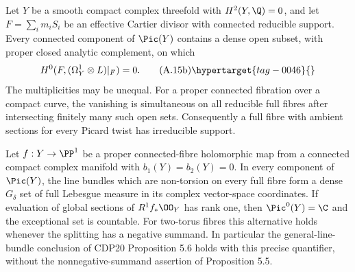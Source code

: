 \begin{proposition}\hypertarget{tag-01AP}{}\label{cdp:st:A.3.5}


Let $Y$ be a smooth compact complex threefold with $H^2(Y,\Q)=0$, and let $F=\sum_i m_iS_i$ be an effective Cartier divisor with connected reducible support. Every connected component of $\Pic(Y)$ contains a dense open subset, with proper closed analytic complement, on which
\[
 H^0(F,(\Omega_Y^1\otimes L)|_F)=0.
 \tag{A.15b}\hypertarget{tag-0046}{}\label{cdp:eq:A.15b}
\]
The multiplicities may be unequal. For a proper connected fibration over a compact curve, the vanishing is simultaneous on all reducible full fibres after intersecting finitely many such open sets. Consequently a full fibre with ambient sections for every Picard twist has irreducible support.
\end{proposition}

\begin{proposition}\hypertarget{tag-01FW}{}\label{cdp:st:D.1.11}


Let $f:Y\to\PP^1$ be a proper connected-fibre holomorphic map from
a connected compact complex manifold with $b_1(Y)=b_2(Y)=0$.
In every component of $\Pic(Y)$, the line
bundles which are non-torsion on every full fibre form a dense
$G_\delta$ set of full Lebesgue measure in its complex vector-space
coordinates. If evaluation of global sections of $R^1f_*\OO_Y$
has rank one, then $\Pic^0(Y)=\C$ and the exceptional set is
countable. For two-torus fibres this alternative holds whenever
the splitting has a negative summand.
In particular the general-line-bundle conclusion of CDP20
Proposition 5.6 holds with this precise quantifier, without the
nonnegative-summand assertion of Proposition 5.5.
\end{proposition}

